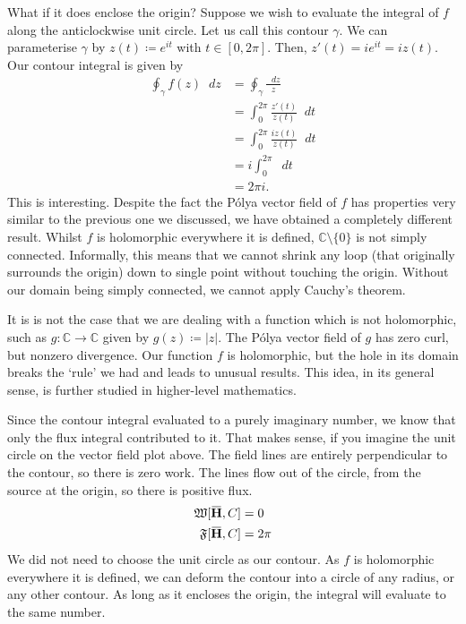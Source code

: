 \documentclass[a4paper]{article}
\newcommand*\diff{\mathop{}\!d} %
\newcommand{\C}{\mathbb{C}}
\newcommand{\overbar}[1]{\mkern 1.5mu\overline{\mkern-1.5mu#1\mkern-1.5mu}\mkern 1.5mu}
\theoremstyle{definition}
\begin{document}
What if it does enclose the origin?
Suppose we wish to evaluate the integral of $f$ along the anticlockwise unit circle.
Let us call this contour $\gamma$.
We can parameterise $\gamma$ by $z(t) \coloneq e^{it}$ with $t \in [0, 2\pi]$.
Then, $z'(t) = ie^{it} = iz(t)$.
Our contour integral is given by
\begin{align*}
    \oint_\gamma f(z) \diff z & = \oint_\gamma \frac{\diff z}{z}           \\
                              & = \int_0^{2\pi} \frac{z'(t)}{z(t)} \diff t \\
                              & = \int_0^{2\pi} \frac{iz(t)}{z(t)} \diff t \\
                              & = i \int_0^{2\pi} \diff t                  \\
                              & = 2\pi i.
\end{align*}
This is interesting.
Despite the fact the P\'olya vector field of $f$ has properties very similar to the previous one we discussed, we have obtained a completely different result.
Whilst $f$ is holomorphic everywhere it is defined, $\C \setminus \{0\}$ is not simply connected.
Informally, this means that we cannot shrink any loop (that originally surrounds the origin) down to single point without touching the origin.
Without our domain being simply connected, we cannot apply Cauchy's theorem.

It is is not the case that we are dealing with a function which is not holomorphic, such as $g \colon \C \to \C$ given by $g(z) \coloneq \lvert z \rvert$.
The P\'olya vector field of $g$ has zero curl, but nonzero divergence.
Our function $f$ is holomorphic, but the hole in its domain breaks the `rule' we had and leads to unusual results.
This idea, in its general sense, is further studied in higher-level mathematics.

Since the contour integral evaluated to a purely imaginary number, we know that only the flux integral contributed to it.
That makes sense, if you imagine the unit circle on the vector field plot above.
The field lines are entirely perpendicular to the contour, so there is zero work.
The lines flow out of the circle, from the source at the origin, so there is positive flux.
\begin{align*}
    \mathfrak{W}[\mathbf{\overbar{H}}, C] & = 0    \\
    \mathfrak{F}[\mathbf{\overbar{H}}, C] & = 2\pi
\end{align*}
We did not need to choose the unit circle as our contour.
As $f$ is holomorphic everywhere it is defined, we can deform the contour into a circle of any radius, or any other contour.
As long as it encloses the origin, the integral will evaluate to the same number.
\end{document}
